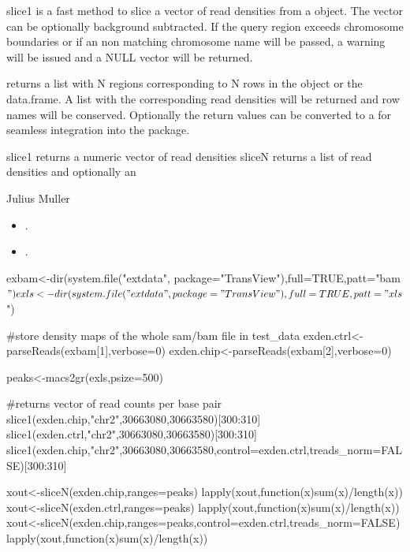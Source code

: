 \documentclass[letterpaper]{book}
\begin{document}
\begin{Details}

slice1 is a fast method to slice a vector of read densities from a  object.
The vector can be optionally background subtracted. If the query region exceeds chromosome boundaries 
or if an non matching chromosome name will be passed, a warning will be issued and a NULL vector will be returned.

 returns a list with N regions corresponding to N rows in the  object or the data.frame. A list with the 
corresponding read densities will be returned and row names will be conserved. Optionally 
the return values can be converted to a  for seamless integration into the 
 package.

\end{Details}
%
\begin{Value}
slice1 returns a numeric vector of read densities
sliceN returns a list of read densities and optionally an 
\end{Value}
%
\begin{Author}
Julius Muller 
\end{Author}
%
\begin{SeeAlso}
\begin{itemize}

\item{} .
\item{} .

\end{itemize}

\end{SeeAlso}
%
\begin{Examples}
\begin{ExampleCode}

exbam<-dir(system.file("extdata", package="TransView"),full=TRUE,patt="bam$")
exls<-dir(system.file("extdata", package="TransView"),full=TRUE,patt="xls$")

#store density maps of the whole sam/bam file in test_data
exden.ctrl<-parseReads(exbam[1],verbose=0)
exden.chip<-parseReads(exbam[2],verbose=0)

peaks<-macs2gr(exls,psize=500)

#returns vector of read counts per base pair
slice1(exden.chip,"chr2",30663080,30663580)[300:310]
slice1(exden.ctrl,"chr2",30663080,30663580)[300:310]
slice1(exden.chip,"chr2",30663080,30663580,control=exden.ctrl,treads_norm=FALSE)[300:310]

xout<-sliceN(exden.chip,ranges=peaks)
lapply(xout,function(x)sum(x)/length(x))
xout<-sliceN(exden.ctrl,ranges=peaks)
lapply(xout,function(x)sum(x)/length(x))
xout<-sliceN(exden.chip,ranges=peaks,control=exden.ctrl,treads_norm=FALSE)
lapply(xout,function(x)sum(x)/length(x))


\end{ExampleCode}
\end{Examples}
\end{document}
